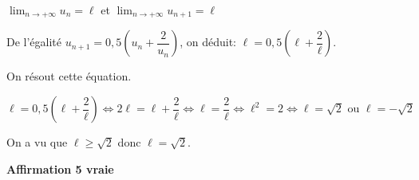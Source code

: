 \documentclass[10pt]{article}
\providecommand{\blue}{\color{blue}}
\providecommand{\blue}{\color{blue}}
\providecommand{\ds}{\displaystyle}
\begin{document}
\begin{enumerate}
$\ds\lim_{n\to + \infty} u_n = \ell$ et $\ds\lim_{n\to + \infty} u_{n+1} = \ell$

De l'égalité $u_{n+1} = 0,5 \left ( u_n + \dfrac{2}{u_n} \right )$, on déduit:
$\ell = 0,5 \left ( \ell + \dfrac{2}{\ell} \right )$. 

On résout cette équation.

$\ell = 0,5 \left ( \ell + \dfrac{2}{\ell}\right )
\iff
2\ell = \ell + \dfrac{2}{\ell}
\iff
\ell=\dfrac{2}{\ell}
\iff
\ell^2=2
\iff
\ell=\sqrt{2} \text{ ou } \ell=-\sqrt{2}$

On a vu que $\ell\geqslant \sqrt{2}$ donc $\ell=\sqrt{2}$.

\hfill{\blue\bf Affirmation 5 vraie}		

\end{enumerate}
\end{document}
